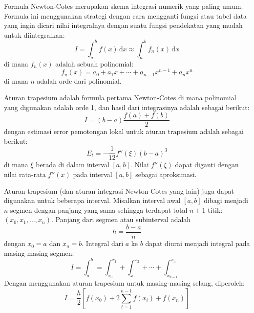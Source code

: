 
Formula Newton-Cotes merupakan skema integrasi numerik yang paling umum.
Formula ini menggunakan strategi dengan cara mengganti fungsi atau tabel data
yang ingin dicari nilai integralnya dengan suatu fungsi pendekatan yang
mudah untuk diintegralkan:
\begin{equation}
I = \int_{a}^{b} f(x) \, \mathrm{d}x \approx \int_{a}^{b} f_{n}(x) \, \mathrm{d}x
\end{equation}
di mana $f_{n}(x)$ adalah sebuah polinomial:
\begin{equation}
f_{n}(x) = a_{0} + a_{1}x + \cdots + a_{n-1} x^{n-1} + a_{n} x^{n}
\end{equation}
di mana $n$ adalah orde dari polinomial.

Aturan trapesium adalah formula pertama Newton-Cotes di mana polinomial yang digunakan
adalah orde 1, dan hasil dari integrasinya adalah sebagai berikut:
\begin{equation}
I = (b - a) \frac{f(a) + f(b)}{2}
\end{equation}
dengan estimasi error pemotongan lokal untuk aturan trapesium adalah sebagai berikut:
\begin{equation}
E_{t} = -\frac{1}{12} f''(\xi) (b - a)^3
\end{equation}
di mana $\xi$ berada di dalam interval $[a,b]$. Nilai $f''(\xi)$ dapat diganti dengan nilai
rata-rata $f''(x)$ pada interval $[a,b]$ sebagai aproksimasi.

Aturan trapesium (dan aturan integrasi Newton-Cotes yang lain)
juga dapat digunakan untuk beberapa interval. Misalkan interval
awal $[a,b]$ dibagi menjadi $n$ segmen dengan panjang yang sama sehingga terdapat
total $n+1$ titik: $(x_0, x_1, \ldots, x_n)$. Panjang dari segmen atau subinterval
adalah
\begin{equation*}
h = \frac{b - a}{n}
\end{equation*}
dengan $x_0 = a$ dan $x_n = b$. Integral dari $a$ ke $b$ dapat diurai menjadi
integral pada masing-masing segmen:
\begin{equation*}
I = \int_{a}^{b} = \int_{x_0}^{x_1} + \int_{x_1}^{x_2} + \cdots + \int_{x_{n-1}}^{x_n}
\end{equation*}
Dengan menggunakan aturan trapesium untuk masing-masing selang, diperoleh:
\begin{equation}
I = \frac{h}{2}\left[
    f(x_{0}) + 2\sum_{i=1}^{n-1} f(x_{i}) + f(x_{n})
\right]
\end{equation}

